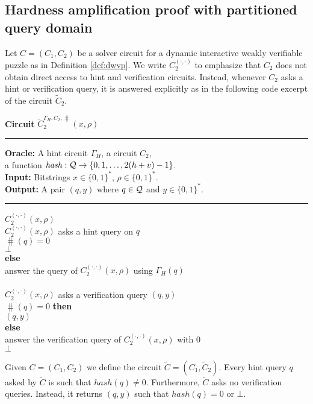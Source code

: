 %
\subsection{Hardness amplification proof with partitioned query domain}
\label{st:amplification_proof}
Let $C = (C_1, C_2)$ be a solver circuit for a dynamic interactive weakly verifiable puzzle as in Definition \ref{def:dwvp}.
We write $C_2^{(\cdot, \cdot)}$ to emphasize that $C_2$ does not obtain direct access to hint and verification circuits.
Instead, whenever $C_2$ asks a hint or verification query, it is answered explicitly
as in the following code excerpt of the circuit $\widetilde{C}_2$.
\begin{codeblock}
  \textbf{Circuit} $\widetilde{C}_2^{\Gamma_H, C_2, \hash} (x, \rho)$
  \medskip \hrule
  \textbf{Oracle:} A hint circuit $\Gamma_H$, a circuit $C_2$, \\ \IndII a function $\operatorname{\mathit{hash}} : \mathcal{Q} \rightarrow \{0,1,\dots, 2(h+v)-1\}$. \\
  \textbf{Input:} Bitstrings $x \in \{0,1\}^{*}$, $\rho \in \{0,1\}^{*}$. \\
  \textbf{Output:} A pair $(q, y)$ where $q \in \mathcal{Q}$ and $y \in \{0,1\}^{*}$.
  \medskip\hrule
  \Run $C_2^{(\cdot, \cdot)}(x, \rho)$ \\
  \IndI \If $C_2^{(\cdot, \cdot)}(x, \rho)$ asks a hint query on $q$ \Then\\
  \IndII \If $\hash(q) = 0$ \Then\\
  \IndIII \Return $\bot$\\
  \IndII \textbf{else}\\
  \IndIII answer the query of $C_2^{(\cdot, \cdot)}(x, \rho)$ using $\Gamma_H(q)$\\
  \\
  \IndI \If $C_2^{(\cdot, \cdot)}(x, \rho)$ asks a verification query $(q, y)$ \Then \\
  \IndII \If $\hash(q) = 0 $ \textbf{then} \\
  \IndIII \Return $(q, y)$ \\
  \IndII \textbf{else} \\
  \IndIII answer the verification query of $C_2^{(\cdot, \cdot)}(x, \rho)$ with 0 \\
  \Return $\bot$
\end{codeblock}
%
Given $C = (C_1, C_2)$ we define the circuit $\widetilde{C} = (C_1, \widetilde{C}_2)$.
Every hint query $q$ asked by $\widetilde{C}$ is such that $hash(q) \neq 0$.
Furthermore, $\widetilde{C}$ asks no verification queries. Instead, it returns $(q,y)$ such that
$hash(q) = 0$ or $\bot$.

